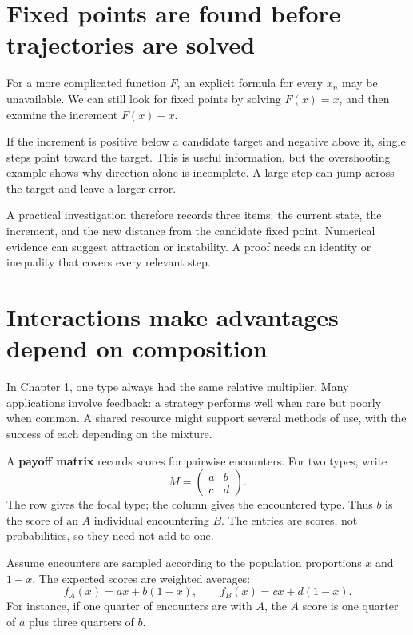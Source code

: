 \documentclass[11pt,oneside,openany]{book}
\theoremstyle{definition}
\theoremstyle{remark}
\numberwithin{equation}{chapter}
\begin{document}
\section{Fixed points are found before trajectories are solved}\label{ch02-fixed-points-are-found-before-trajectories-are-solved}

For a more complicated function \(F\), an explicit formula for every \(x_n\) may be unavailable. We can still look for fixed points by solving \(F(x)=x\), and then examine the increment \(F(x)-x\).

If the increment is positive below a candidate target and negative above it, single steps point toward the target. This is useful information, but the overshooting example shows why direction alone is incomplete. A large step can jump across the target and leave a larger error.

A practical investigation therefore records three items: the current state, the increment, and the new distance from the candidate fixed point. Numerical evidence can suggest attraction or instability. A proof needs an identity or inequality that covers every relevant step.

\section{Interactions make advantages depend on composition}\label{ch02-interactions-make-advantages-depend-on-composition}

In Chapter 1, one type always had the same relative multiplier. Many applications involve feedback: a strategy performs well when rare but poorly when common. A shared resource might support several methods of use, with the success of each depending on the mixture.

A \textbf{payoff matrix} records scores for pairwise encounters. For two types, write \[M=\begin{pmatrix}a&b\\c&d\end{pmatrix}.\] The row gives the focal type; the column gives the encountered type. Thus \(b\) is the score of an \(A\) individual encountering \(B\). The entries are scores, not probabilities, so they need not add to one.

Assume encounters are sampled according to the population proportions \(x\) and \(1-x\). The expected scores are weighted averages: \[f_A(x)=ax+b(1-x),\qquad f_B(x)=cx+d(1-x).\] For instance, if one quarter of encounters are with \(A\), the \(A\) score is one quarter of \(a\) plus three quarters of \(b\).
\end{document}
